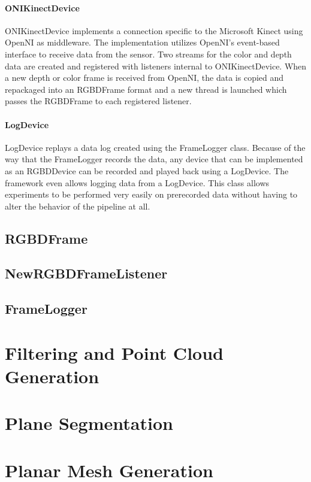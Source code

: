 \paragraph{ONIKinectDevice} ONIKinectDevice implements a connection specific to the Microsoft Kinect using OpenNI as middleware. The implementation utilizes OpenNI's event-based interface to receive data from the sensor. Two streams for the color and depth data are created and registered with listeners internal to ONIKinectDevice. When a new depth or color frame is received from OpenNI, the data is copied and repackaged into an RGBDFrame format and a new thread is launched which passes the RGBDFrame to each registered listener. 
\paragraph{LogDevice} LogDevice replays a data log created using the FrameLogger class. Because of the way that the FrameLogger records the data, any device that can be implemented as an RGBDDevice can be recorded and played back using a LogDevice. The framework even allows logging data from a LogDevice. This class allows experiments to be performed very easily on prerecorded data without having to alter the behavior of the pipeline at all.
\subsection{RGBDFrame}

\subsection{NewRGBDFrameListener}

\subsection{FrameLogger}




\section{Filtering and Point Cloud Generation}
\section{Plane Segmentation}
\section{Planar Mesh Generation}